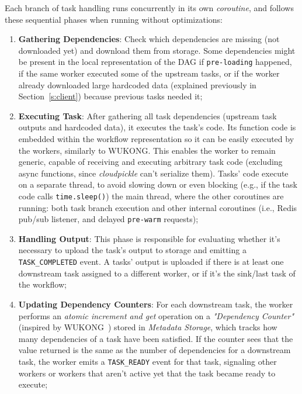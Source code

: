Each branch of task handling runs concurrently in its own \textit{coroutine}, and follows these sequential phases when running without optimizations:
\begin{enumerate}
    \item \textbf{Gathering Dependencies}: Check which dependencies are missing (not downloaded yet) and download them from storage. Some dependencies might be present in the local representation of the DAG if \texttt{pre-loading} happened, if the same worker executed some of the upstream tasks, or if the worker already downloaded large hardcoded data (explained previously in Section~\ref{s:client}) because previous tasks needed it;
    \item \textbf{Executing Task}: After gathering all task dependencies (upstream task outputs and hardcoded data), it executes the task's code. Its function code is embedded within the workflow representation so it can be easily executed by the workers, similarly to WUKONG. This enables the worker to remain generic, capable of receiving and executing arbitrary task code (excluding async functions, since \textit{cloudpickle} can't serialize them). Tasks' code execute on a separate thread, to avoid slowing down or even blocking (e.g., if the task code calls \texttt{time.sleep()}) the main thread, where the other coroutines are running: both task branch execution and other internal coroutines (i.e., Redis pub/sub listener, and delayed \texttt{pre-warm} requests);
    \item \textbf{Handling Output}: This phase is responsible for evaluating whether it's necessary to upload the task's output to storage and emitting a \texttt{TASK\_COMPLETED} event. A tasks' output is uploaded if there is at least one downstream task assigned to a different worker, or if it's the sink/last task of the workflow;
    \item \textbf{Updating Dependency Counters}: For each downstream task, the worker performs an \textit{atomic increment and get} operation on a \textit{"Dependency Counter"} (inspired by WUKONG~\cite{wukong_2}) stored in \textit{Metadata Storage}, which tracks how many dependencies of a task have been satisfied. If the counter sees that the value returned is the same as the number of dependencies for a downstream task, the worker emits a \texttt{TASK\_READY} event for that task, signaling other workers or workers that aren't active yet that the task became ready to execute;

\end{enumerate}
